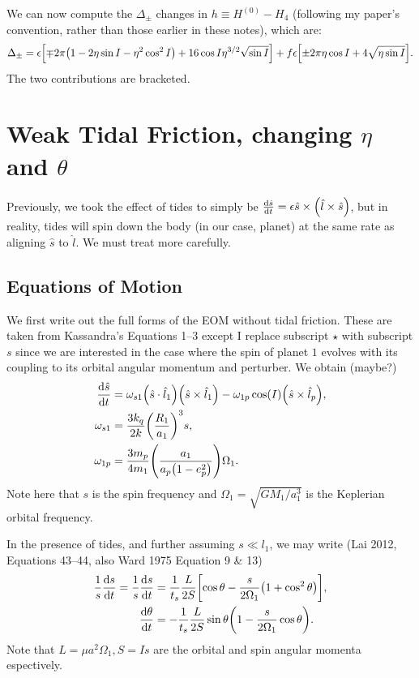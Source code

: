 \documentclass[11pt,
        usenames, %
        dvipsnames %
    ]{article}
\newcommand*{\rd}[2]{\frac{\mathrm{d}#1}{\mathrm{d}#2}}
\DeclarePairedDelimiter\p{\lparen}{\rparen}
\DeclarePairedDelimiter\s{\lbrack}{\rbrack}
\begin{document}
We can now compute the $\Delta_{\pm}$ changes in $h \equiv H^{(0)} - H_4$
(following my paper's convention, rather than those earlier in these notes),
which are:
\begin{equation}
    \Delta_{\pm} = \epsilon\s*{\mp 2\pi \p*{1 - 2\eta \sin I - \eta^2 \cos^2 I} +
        16\cos I\eta^{3/2}\sqrt{\sin I}} + f\epsilon
            \s*{\pm 2\pi \eta \cos I + 4\sqrt{\eta \sin I}}.
\end{equation}
The two contributions are bracketed.

\section{Weak Tidal Friction, changing $\eta$ and $\theta$}

Previously, we took the effect of tides to simply be $\rd{\hat{s}}{t} = \epsilon
\hat{s} \times \p*{\hat{l} \times \hat{s}}$, but in reality, tides will spin
down the body (in our case, planet) at the same rate as aligning $\hat{s}$ to
$\hat{l}$. We must treat more carefully.

\subsection{Equations of Motion}

We first write out the full forms of the EOM without tidal friction. These are
taken from Kassandra's Equations 1--3 except I replace subscript $\star$ with
subscript $s$ since we are interested in the case where the spin of planet $1$
evolves with its coupling to its orbital angular momentum and perturber. We
obtain (maybe?)
\begin{align}
    \rd{\hat{s}}{t}
        &= \omega_{s1}\p*{\hat{s} \cdot \hat{l}_1}\p*{\hat{s} \times \hat{l}_1}
            - \omega_{1p}\cos(I)\p*{\hat{s} \times \hat{l}_p},\\
    \omega_{s1} &= \frac{3k_q}{2k} \p*{\frac{R_1}{a_1}}^3 s,\\
    \omega_{1p} &= \frac{3m_p}{4m_1}\p*{\frac{a_1}{a_p\p*{1 - e_p^2}}} \Omega_1.
\end{align}
Note here that $s$ is the spin frequency and $\Omega_1 =
\sqrt{GM_1/a_1^3}$ is the Keplerian orbital frequency.

In the presence of tides, and further assuming $s \ll l_1$, we may write (Lai
2012, Equations 43--44, also Ward 1975 Equation 9 \& 13)
\begin{align}
    \frac{1}{s}\rd{s}{t}
        = \frac{1}{s}\rd{s}{t}
        &= \frac{1}{t_s}\frac{L}{2S}\s*{\cos\theta
            - \frac{s}{2\Omega_1}\p*{1 + \cos^2\theta}},\\
    \rd{\theta}{t} &= -\frac{1}{t_s}\frac{L}{2S}
        \sin\theta\p*{1 - \frac{s}{2\Omega_1}\cos\theta}.
\end{align}
Note that $L = \mu a^2\Omega_1, S = Is$ are the orbital and spin angular momenta
espectively.
\end{document}
